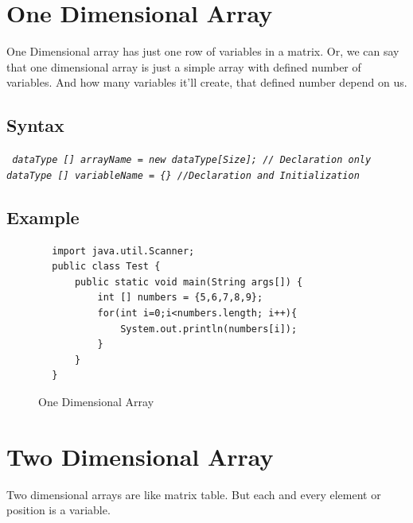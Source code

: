 \documentclass[openany]{book}  %
\begin{document}
\section{One Dimensional Array}
One Dimensional array has just one row of variables in a matrix.
Or, we can say that one dimensional array is just a simple array
with defined number of variables. And how many variables it'll
create, that defined number depend on us.
% 
%
\subsection{Syntax}
\begin{center}
    \tt{
        \textit{dataType [] arrayName = new dataType[Size]; // Declaration only \\
        dataType [] variableName = \{\} //Declaration and Initialization }
    }
\end{center}
% 
%
\subsection{Example}
\begin{center}
    \begin{verbatim}
        import java.util.Scanner;
        public class Test {
            public static void main(String args[]) {
                int [] numbers = {5,6,7,8,9};
                for(int i=0;i<numbers.length; i++){
                    System.out.println(numbers[i]);
                }
            }
        }
    \end{verbatim}
\end{center}
% 
% 
\begin{figure}[h!t]
    \begin{center}
        \caption{One Dimensional Array}
    \end{center}
\end{figure}
% 
% 
\section{Two Dimensional Array}
Two dimensional arrays are like matrix table. But each and every 
element or position is a variable.
% 
% 
\end{document}
